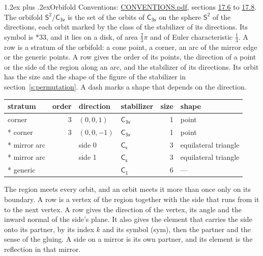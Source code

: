 \documentclass[10pt,a4paper]{article}
\makeatletter
\renewcommand\section{\@startsection{section}{1}{\z@}{-3ex plus -1ex minus -.2ex}%
  {1.2ex plus .2ex}{\normalfont\large\sffamily\bfseries\color{parttitle}}}
\numberwithin{equation}{section}
\newcommand{\grp}[1]{\mathsf{#1}}
\newcommand{\orbname}[1]{#1}
\newcommand{\dirvec}[3]{(#1, #2, #3)}
\newcommand{\twosphere}{\mathsf{S}^{2}}
\makeatother
\begin{document}
\section{Orbifold}\label{s:orbifold}
Conventions: \href{../../CONVENTIONS.pdf}{CONVENTIONS.pdf}, sections \href{../../CONVENTIONS.pdf\#conv.17.6}{17.6} to \href{../../CONVENTIONS.pdf\#conv.17.8}{17.8}.
The orbifold $\twosphere/\grp{C_{3v}}$ is the set of the orbits of $\grp{C_{3v}}$ on the sphere $\twosphere$ of the directions, each orbit marked by the class of the stabilizer of its directions. Its symbol is $\orbname{{\ast}33}$, and it lies on a disk, of area $\tfrac{2}{3}\pi$ and of Euler characteristic $\tfrac{1}{3}$.
\leavevmode\label{n:head.stratum}\label{n:head.order.point}\label{n:head.direction}\label{n:head.stabilizer}\label{n:head.size.orbit}\label{n:head.shape}A row is a stratum of the orbifold: a cone point, a corner, an arc of the mirror edge or the generic points. A row gives the order of its points, the direction of a point or the side of the region along an arc, and the stabilizer of its directions. Its orbit has the size and the shape of the figure of the stabilizer in section~\ref{s:permutation}. A dash marks a shape that depends on the direction.
{\small\setlength{\tabcolsep}{4pt}\begin{longtable}{@{}lrllrl@{}}\toprule
stratum & order & direction & stabilizer & size & shape\\\midrule\endhead
\bottomrule\endfoot\endlastfoot
corner & 3 & $\dirvec{0}{0}{1}$ & \href{C3v.pdf}{$\grp{C_{3v}}$} & 1 & point\\*
corner & 3 & $\dirvec{0}{0}{-1}$ & \href{C3v.pdf}{$\grp{C_{3v}}$} & 1 & point\\*
mirror arc &  & side 0 & \href{C1v.pdf}{$\grp{C_{s}}$} & 3 & equilateral triangle\\*
mirror arc &  & side 1 & \href{C1v.pdf}{$\grp{C_{s}}$} & 3 & equilateral triangle\\*
generic &  &  & \href{C1.pdf}{$\grp{C_{1}}$} & 6 & ---\\
\bottomrule\end{longtable}}
\leavevmode\label{n:head.vertex.region}\label{n:head.angle}\label{n:head.normal.side}\label{n:head.partner}\label{n:head.sense}The region meets every orbit, and an orbit meets it more than once only on its boundary. A row is a vertex of the region together with the side that runs from it to the next vertex. A row gives the direction of the vertex, its angle and the inward normal of the side's plane. It also gives the element that carries the side onto its partner, by its index $k$ and its symbol (sym), then the partner and the sense of the gluing. A side on a mirror is its own partner, and its element is the reflection in that mirror.
\end{document}
